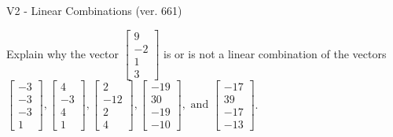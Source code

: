 \begin{exercise}
  \begin{exerciseTitle}V2 - Linear Combinations (ver. 661)\end{exerciseTitle}
  \begin{exerciseStatement}
    Explain why the vector \(\left[\begin{array}{c}
9 \\
-2 \\
1 \\
3
\end{array}\right]\)  is or is not a linear 
	combination of the vectors \(\left[\begin{array}{c}
-3 \\
-3 \\
-3 \\
1
\end{array}\right] , \left[\begin{array}{c}
4 \\
-3 \\
4 \\
1
\end{array}\right] , \left[\begin{array}{c}
2 \\
-12 \\
2 \\
4
\end{array}\right] , \left[\begin{array}{c}
-19 \\
30 \\
-19 \\
-10
\end{array}\right] , \text{ and } \left[\begin{array}{c}
-17 \\
39 \\
-17 \\
-13
\end{array}\right]\).
	



\end{exerciseStatement}
\end{exercise}
